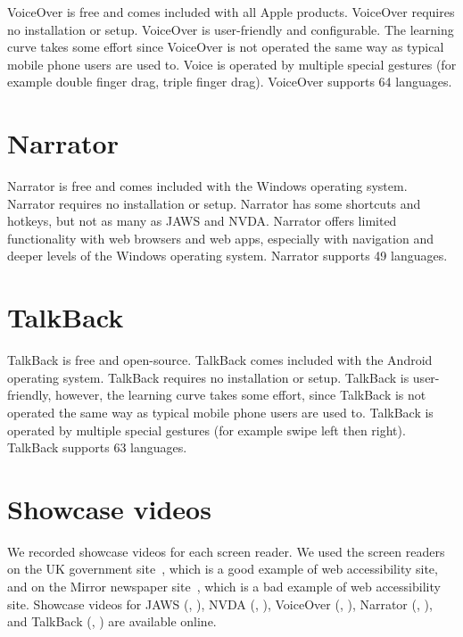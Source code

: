 VoiceOver is free and comes included with all Apple products. VoiceOver requires no installation or setup. VoiceOver is user-friendly and configurable. The learning curve takes some effort since VoiceOver is not operated the same way as typical mobile phone users are used to. Voice is operated by multiple special gestures (for example double finger drag, triple finger drag). VoiceOver supports 64 languages.

\section{Narrator}

Narrator is free and comes included with the Windows operating system. Narrator requires no installation or setup. Narrator has some shortcuts and hotkeys, but not as many as JAWS and NVDA. Narrator offers limited functionality with web  browsers and web apps, especially with navigation and deeper levels of the Windows operating system. Narrator supports 49 languages.

\section{TalkBack}

TalkBack is free and open-source. TalkBack comes included with the Android operating system. TalkBack requires no installation or setup. TalkBack is user-friendly, however, the learning curve takes some effort, since TalkBack is not operated the same way as typical mobile phone users are used to. TalkBack is operated by multiple special gestures (for example swipe left then right). TalkBack supports 63 languages.

\section{Showcase videos}
We recorded showcase videos for each screen reader. We used the screen readers on the UK government site~\parencite{GovUK}, which is a good example of web accessibility site, and on the Mirror newspaper site~\parencite{MirrorUK}, which is a bad example of web accessibility site.
Showcase videos for JAWS (\parencite{JAWS_gov}, \parencite{JAWS_mirror}), NVDA (\parencite{NVDA_gov}, \parencite{NVDA_mirror}), VoiceOver (\parencite{VoiceOver_gov}, \parencite{VoiceOver_mirror}), Narrator (\parencite{Narrator_gov}, \parencite{Narrator_mirror}), and TalkBack (\parencite{TalkBack_gov}, \parencite{TalkBack_mirror}) are available online.


